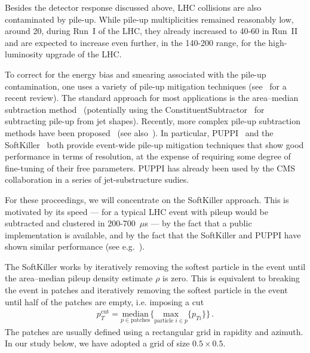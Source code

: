 \documentclass[11pt]{cernrep}
\begin{document}
Besides the detector response discussed above, LHC collisions are also
contaminated by pile-up.
%
While pile-up multiplicities remained reasonably low, around 20, during Run~I of
the LHC, they already increased to 40-60 in Run~II and are expected to
increase even further, in the 140-200 range, for the high-luminosity
upgrade of the LHC.

To correct for the energy bias and smearing associated with the
pile-up contamination, one uses a variety of pile-up mitigation
techniques (see~\cite{Soyez:2018opl} for a recent review). The
standard approach for most applications is the area--median
subtraction
method~\cite{Cacciari:2007fd,Cacciari:2008gn,AlcarazMaestre:2012vp,Soyez:2012hv}
(potentially using the ConstituentSubtractor~\cite{Berta:2014eza} for
subtracting pile-up from jet shapes). Recently, more complex pile-up
subtraction methods have been
proposed~\cite{Krohn:2013lba,Bertolini:2014bba,Cacciari:2014gra} (see
also~\cite{Tseng:2013dva,Cacciari:2014jta}). In particular,
PUPPI~\cite{Bertolini:2014bba} and the
SoftKiller~\cite{Cacciari:2014gra} both provide event-wide pile-up
mitigation techniques that show good performance in terms of
resolution, at the expense of requiring some degree of fine-tuning of
their free parameters.
%
PUPPI has already been used by the CMS collaboration in a series of
jet-substructure sudies.

For these proceedings, we will concentrate on the SoftKiller approach.
This is motivated by its speed --- for a typical LHC event with pileup
would be subtracted and clustered in 200-700~$\mu$s --- by the fact
that a public implementation is available, and by the fact that the
SoftKiller and PUPPI have shown similar performance (see e.g.~\cite{puws14}).


The SoftKiller works by iteratively removing the softest particle in
the event until the area--median pileup density estimate $\rho$ is
zero. This is equivalent to breaking the event in patches and
iteratively removing the softest particle in the event until half of
the patches are empty, i.e. imposing a cut
%
\begin{align}
p_T^{\text{cut}}=\underset{p \in \text{patches}}{\text{median}}\Big\{
  \underset{\text{particle }i\in p}{\text{max}}\{ p_{Ti}\}\Big\}\,.
\end{align}
%
The patches are usually defined using a rectangular grid in rapidity
and azimuth. In our study below, we have adopted a grid of size
$0.5\times 0.5$.
\end{document}
